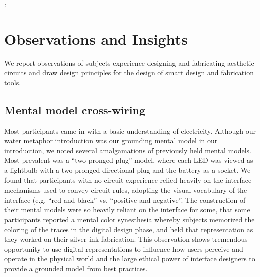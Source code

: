 \documentclass{sigchi}
\begin{document}
  \begin{myquote}
   \vspace{-2pt}
    :
    \vspace{-2pt}
  \end{myquote}
  
 

\section{Observations and Insights}
  We report observations of subjects experience designing and fabricating aesthetic circuits and draw design principles for the design of smart design and fabrication tools. 
  
  \subsection{Mental model cross-wiring}
  Most participants came in with a basic understanding of electricity. Although our water metaphor introduction was our grounding mental model in our introduction, we noted several amalgamations of previously held mental models. Most prevalent was a ``two-pronged plug'' model, where each LED was viewed as a lightbulb with a two-pronged directional plug and the battery as a socket. We found that participants with no circuit experience relied heavily on the interface mechanisms used to convey circuit rules, adopting the visual vocabulary of the interface (e.g. ``red and black'' vs. ``positive and negative''. The construction of their mental models were so heavily reliant on the interface for some, that some participants reported a mental color synesthesia whereby subjects memorized the coloring of the traces in the digital design phase, and held that representation as they worked on their silver ink fabrication. This observation shows tremendous opportunity to use digital representations to influence how users perceive and operate in the physical world and the large ethical power of interface designers to provide a grounded model from best practices. 
\end{document}
